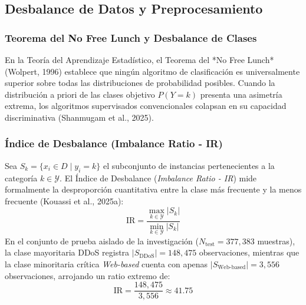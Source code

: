 \subsection{Desbalance de Datos y Preprocesamiento}

\subsubsection{Teorema del No Free Lunch y Desbalance de Clases}
En la Teoría del Aprendizaje Estadístico, el Teorema del *No Free Lunch* (Wolpert, 1996) establece que ningún algoritmo de clasificación es universalmente superior sobre todas las distribuciones de probabilidad posibles. Cuando la distribución a priori de las clases objetivo $P(Y=k)$ presenta una asimetría extrema, los algoritmos supervisados convencionales colapsan en su capacidad discriminativa (Shanmugam et al., 2025).

\subsubsection{Índice de Desbalance (Imbalance Ratio - IR)}
Sea $S_k = \{x_i \in D \mid y_i = k\}$ el subconjunto de instancias pertenecientes a la categoría $k \in \mathcal{Y}$. El Índice de Desbalance (\textit{Imbalance Ratio - IR}) mide formalmente la desproporción cuantitativa entre la clase más frecuente y la menos frecuente (Kouassi et al., 2025a):
\begin{equation}
\mathrm{IR} = \frac{\max_{k \in \mathcal{Y}} |S_k|}{\min_{k \in \mathcal{Y}} |S_k|}
\end{equation}
En el conjunto de prueba aislado de la investigación ($N_{\mathrm{test}} = 377,383$ muestras), la clase mayoritaria DDoS registra $|S_{\mathrm{DDoS}}| = 148,475$ observaciones, mientras que la clase minoritaria crítica \textit{Web-based} cuenta con apenas $|S_{\mathrm{Web\text{-}based}}| = 3,556$ observaciones, arrojando un ratio extremo de:
\begin{equation}
\mathrm{IR} = \frac{148,475}{3,556} \approx 41.75
\end{equation}

